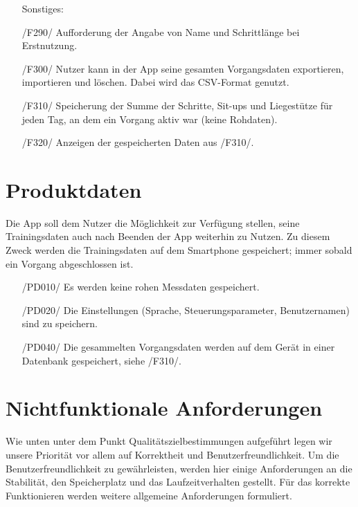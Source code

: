 \documentclass[a4paper,12pt]{article}
\begin{document}
\begin{itemize}
      Sonstiges:
      \item[/F290/] Aufforderung der Angabe von Name und Schrittlänge bei Erstnutzung.
      \item[/F300/] Nutzer kann in der App seine gesamten \Gls{Vorgangsdaten} exportieren, importieren und löschen. Dabei wird das CSV-Format genutzt. 
      \item[/F310/] Speicherung der Summe der Schritte, Sit-ups und Liegestütze für jeden Tag, an dem ein \Gls{Vorgang} aktiv war (keine \Gls{Rohdaten}).
      \item[/F320/] Anzeigen der gespeicherten Daten aus /F310/.
      \end{itemize}


\section{Produktdaten}
Die App soll dem Nutzer die Möglichkeit zur Verfügung stellen, seine Trainingsdaten auch nach Beenden der App weiterhin zu Nutzen. Zu diesem Zweck werden die Trainingsdaten auf dem Smartphone gespeichert; immer sobald ein Vorgang abgeschlossen ist.
\begin{itemize}
	\item[/PD010/] Es werden keine rohen Messdaten gespeichert.
	\item[/PD020/] Die Einstellungen (Sprache, \Gls{Steuerungsparameter}, Benutzernamen) sind zu speichern. 
	\item[/PD040/] Die gesammelten \Gls{Vorgangsdaten} werden auf dem Gerät in einer Datenbank gespeichert, siehe /F310/.
\end{itemize}


\section{Nichtfunktionale Anforderungen}
Wie unten unter dem Punkt Qualitätszielbestimmungen aufgeführt legen wir unsere Priorität vor allem auf Korrektheit und Benutzerfreundlichkeit. Um die Benutzerfreundlichkeit zu gewährleisten, werden hier einige Anforderungen an die Stabilität, den Speicherplatz und das Laufzeitverhalten gestellt. Für das korrekte Funktionieren werden weitere allgemeine Anforderungen formuliert.
\end{document}
